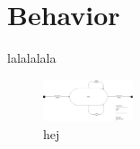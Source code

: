 \section{Behavior}
lalalalala

\begin{figure}
\includegraphics[width=100]{input/problem_domain_analysis/Klasse diagram_department.jpg}
\caption{hej}
\label{}
\end{figure}